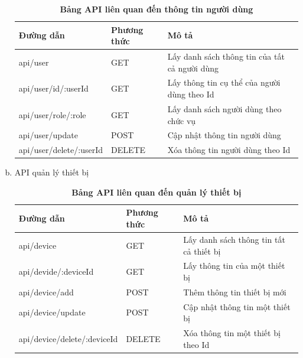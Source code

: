\begin{enumerate}[a)]
  \begin{xltabular}{\textwidth}{
    | >{\raggedright\arraybackslash}p{4cm}
    | >{\centering\arraybackslash}m{2.8cm}
    | >{\raggedright\arraybackslash}X |
    }
    \caption{\bfseries \fontsize{12pt}{0pt}\selectfont Bảng API liên quan đến thông tin người dùng}
    \label{table_api_user}
    \\
    \hline
    \bfseries Đường dẫn    &\bfseries Phương thức    &\bfseries Mô tả\\ \hline
    api/user   &   GET  &  Lấy danh sách thông tin của tất cả người dùng \\  \hline
   api/user/id/:userId  &   GET     & Lấy thông tin cụ thể của người dùng theo Id \\ \hline
   api/user/role/:role  &   GET     & Lấy danh sách người dùng theo chức vụ \\ \hline
   api/user/update   &    POST    &  Cập nhật thông tin người dùng \\  \hline
   api/user/delete/:userId  &   DELETE     & Xóa thông tin người dùng theo Id \\ \hline
  \end{xltabular}

\item API quản lý thiết bị
\begin{xltabular}{\textwidth}{
  | >{\raggedright\arraybackslash}p{4.8cm}
  | >{\centering\arraybackslash}m{2.8cm}
  | >{\raggedright\arraybackslash}X |
  }
  \caption{\bfseries \fontsize{12pt}{0pt}\selectfont Bảng API liên quan đến quản lý thiết bị}
  \label{table_api_device}
  \\
  \hline
  \bfseries Đường dẫn    &\bfseries Phương thức    &\bfseries Mô tả\\ \hline
  api/device   &   GET  & Lấy danh sách thông tin tất cả thiết bị \\ \hline
  api/devide/:deviceId   &    GET    & Lấy thông tin của một thiết bị \\ \hline
  api/device/add &   POST     & Thêm thông tin thiết bị mới \\ \hline
  api/device/update  &     POST   & Cập nhật thông tin một thiết bị \\ \hline
  api/device/delete/:deviceId  &     DELETE   & Xóa thông tin một thiết bị theo Id \\ \hline
\end{xltabular}


\end{enumerate}
